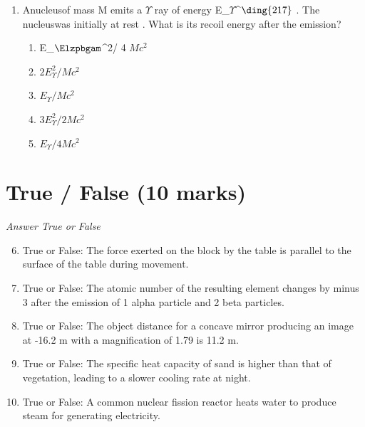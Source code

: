 \documentclass[12pt]{article}
\begin{document}
\begin{enumerate}[label=\arabic*.]
\begin{enumerate}[label=(\alph*)]
    \item 15.5 s
    \item 9.0 s
    \item 8.0 s
    \item 10.5 s
\end{enumerate}
\item Anucleusof mass M emits a \ensuremath{\Upsilon} ray of energy E\_\ensuremath{\Upsilon}^\ensuremath{\ding{217}} . The nucleuswas initially at rest . What is its recoil energy after the emission?
\begin{enumerate}[label=(\alph*)]
    \item E\_\ensuremath{\Elzpbgam}^2/ 4 $Mc^2$
    \item \( 2 E_{\Upsilon}^2 / Mc^2 \)
    \item \( E_{\Upsilon} / Mc^2 \)
    \item \( 3 E_{\Upsilon}^2 / 2 Mc^2 \)
    \item \( E_{\Upsilon} / 4 Mc^2 \)
\end{enumerate}
\end{enumerate}

\section*{True / False (10 marks)}
\textit{Answer True or False}
\begin{enumerate}[label=\arabic*.]
\setcounter{enumi}{5}
\item True or False: The force exerted on the block by the table is parallel to the surface of the table during movement.
\item True or False: The atomic number of the resulting element changes by minus 3 after the emission of 1 alpha particle and 2 beta particles.
\item True or False: The object distance for a concave mirror producing an image at -16.2 m with a magnification of 1.79 is 11.2 m.
\item True or False: The specific heat capacity of sand is higher than that of vegetation, leading to a slower cooling rate at night.
\item True or False: A common nuclear fission reactor heats water to produce steam for generating electricity.
\end{enumerate}
\end{document}
